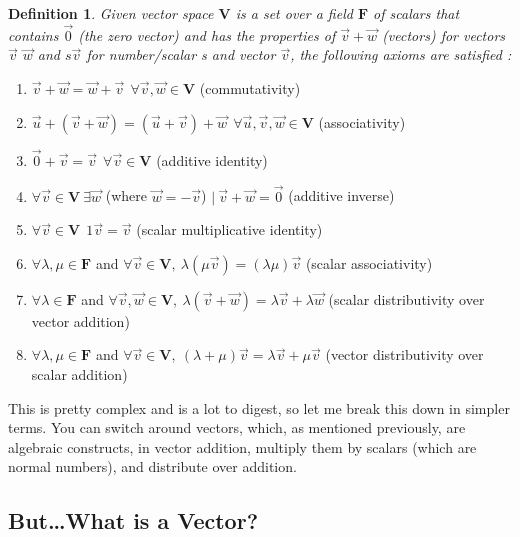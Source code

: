 \documentclass[12pt]{article}
\newtheorem{definition}{Definition}
\begin{document}
\begin{definition}
    Given vector space $\mathbf{V}$ is a set over a field $\mathbf{F}$ of scalars that contains $\vec{0}$ (the zero vector) and has the properties of $\vec{v} + \vec{w}$ (vectors) for vectors $\vec{v}$  $\vec{w}$ and $s\vec{v}$ for number/scalar \emph{s} and vector $\vec{v}$, the following axioms are satisfied \textup{\cite{axiomsUCB}:}
\end{definition}
\begin{enumerate}
    \item $\vec{v} + \vec{w} = \vec{w} + \vec{v} \ \ \forall \vec{v}, \vec{w} \in \mathbf{V} $ (commutativity)~\cite{axiomsUCB}
    \item $\vec{u} + (\vec{v} + \vec{w}) = (\vec{u} + \vec{v}) + \vec{w} \ \ \forall \vec{u}, \vec{v}, \vec{w} \in \mathbf{V} $ (associativity)~\cite{axiomsUCB}
    \item $\vec{0} + \vec{v} = \vec{v} \ \ \forall \vec{v} \in \mathbf{V} $ (additive identity)~\cite{axiomsUCB}
    \item $\forall \vec{v} \in \mathbf{V} \ \exists \vec{w} $ (where $\vec{w} = -\vec{v} $) $ | \ \vec{v} + \vec{w} = \vec{0} $ (additive inverse)~\cite{axiomsUCB}
    \item $\forall \vec{v} \in \mathbf{V} \ \ 1\vec{v} = \vec{v} $ (scalar multiplicative identity)~\cite{axiomsUCB}
    \item $\forall \lambda, \mu \in \mathbf{F} $ and $\forall \vec{v} \in \mathbf{V}, \ \lambda(\mu\vec{v}) = (\lambda\mu)\vec{v} $ (scalar associativity)~\cite{axiomsUCB}
    \item $\forall \lambda \in \mathbf{F} $ and $\forall \vec{v}, \vec{w} \in \mathbf{V}, \ \lambda(\vec{v} + \vec{w}) = \lambda\vec{v} + \lambda\vec{w} $ (scalar distributivity over vector addition)~\cite{axiomsUCB}
    \item $\forall \lambda, \mu \in \mathbf{F} $ and $\forall \vec{v} \in \mathbf{V}, \ (\lambda + \mu)\vec{v} = \lambda\vec{v} + \mu\vec{v} $ (vector distributivity over scalar addition)~\cite{axiomsUCB}
\end{enumerate}

This is pretty complex and is a lot to digest, so let me break this down in simpler terms. You can switch around vectors, which, as mentioned previously, are algebraic constructs, in vector addition, multiply them by scalars (which are normal numbers), and distribute over addition.

\subsection{But\ldots What is a Vector?}
\end{document}
